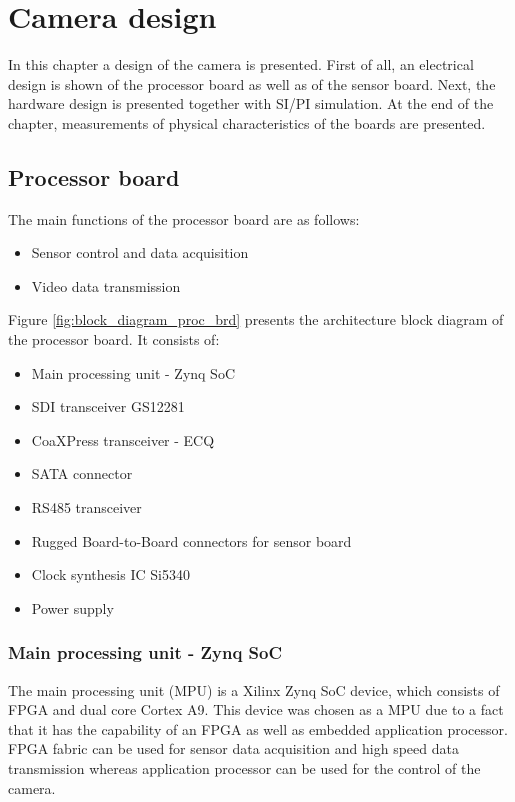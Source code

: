 \chapter{Camera design}

In this chapter a design of the camera is presented. First of all, an electrical design is shown of the processor board as well as of the sensor board. Next, the hardware design is presented together with SI/PI simulation.
At the end of the chapter, measurements of physical characteristics of the boards are presented.

\section{Processor board} 
The main functions of the processor board are as follows:
\begin{itemize}
\item Sensor control and data acquisition
\item Video data transmission
\end{itemize}

Figure \ref{fig:block_diagram_proc_brd} presents the architecture block diagram of the processor board. It consists of:

\begin{itemize}
\item Main processing unit - Zynq SoC
\item SDI transceiver GS12281
\item CoaXPress transceiver - ECQ
\item SATA connector
\item RS485 transceiver
\item Rugged Board-to-Board connectors for sensor board
\item Clock synthesis IC Si5340
\item Power supply 
\end{itemize}

\subsection{Main processing unit - Zynq SoC}
The main processing unit (MPU) is a Xilinx Zynq SoC \cite{ZYNQ} device, which consists of FPGA and dual core Cortex A9. This device was chosen as a MPU due to a fact that it has the capability of an FPGA as well as embedded application processor. FPGA fabric can be used for sensor data acquisition and high speed data transmission whereas application processor can be used for the control of the camera. 

